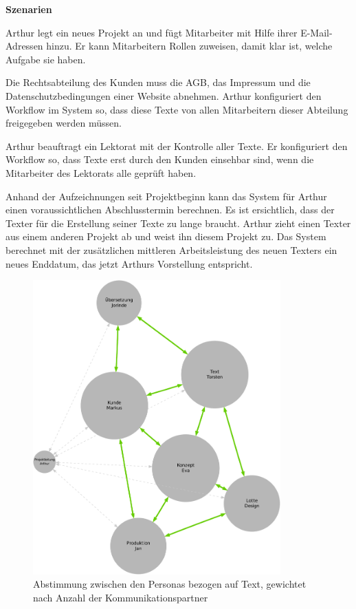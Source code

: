 \begin{multicols}{2}
\textbf{Szenarien}

Arthur legt ein neues Projekt an und fügt Mitarbeiter mit Hilfe ihrer E-Mail-Adressen hinzu. Er kann Mitarbeitern Rollen zuweisen, damit klar ist, welche Aufgabe sie haben. 

Die Rechtsabteilung des Kunden muss die AGB, das Impressum und die Datenschutzbedingungen einer Website abnehmen. Arthur konfiguriert den Workflow im System so, dass diese Texte von allen Mitarbeitern dieser Abteilung freigegeben werden müssen.

Arthur beauftragt ein Lektorat mit der Kontrolle aller Texte. Er konfiguriert den Workflow so, dass Texte erst durch den Kunden einsehbar sind, wenn die Mitarbeiter des Lektorats alle geprüft haben.

Anhand der Aufzeichnungen seit Projektbeginn kann das System für Arthur einen voraussichtlichen Abschlusstermin berechnen. Es ist ersichtlich, dass der Texter für die Erstellung seiner Texte zu lange braucht. Arthur zieht einen Texter aus einem anderen Projekt ab und weist ihn diesem Projekt zu. Das System berechnet mit der zusätzlichen mittleren Arbeitsleistung des neuen Texters ein neues Enddatum, das jetzt Arthurs Vorstellung entspricht.

\end{multicols}

\pagebreak

\begin{figure}[htb]
\begin{center}
\includegraphics[width=0.85\textwidth]{media/personas-gewichtet.pdf}
\caption{Abstimmung zwischen den Personas bezogen auf Text, gewichtet nach Anzahl der Kommunikationspartner}
\label{chart:personas-gewichtet}
\end{center}
\end{figure}